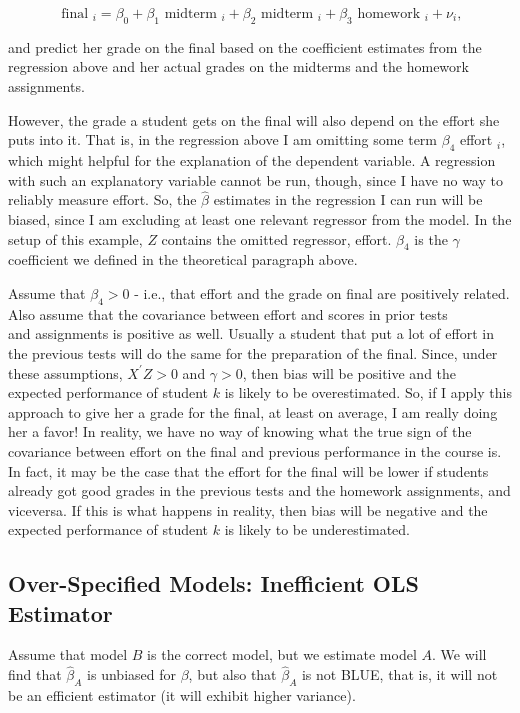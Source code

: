$$
\text { final }_{i}=\beta_{0}+\beta_{1} \text { midterm }_{i}+\beta_{2} \text { midterm }_{i}+\beta_{3} \text { homework }_{i}+\nu_{i},
$$

and predict her grade on the final based on the coefficient estimates from the regression above and her actual grades on the midterms and the homework assignments.

However, the grade a student gets on the final will also depend on the effort she puts into it. That is, in the regression above I am omitting some term $\beta_{4}$ effort $_{i}$, which might helpful for the explanation of the dependent variable. A regression with such an explanatory variable cannot be run, though, since I have no way to reliably measure effort. So, the $\widehat{\beta}$ estimates in the regression I can run will be biased, since I am excluding at least one relevant regressor from the model. In the setup of this example, $Z$ contains the omitted regressor, effort. $\beta_{4}$ is the $\gamma$ coefficient we defined in the theoretical paragraph above.

Assume that $\beta_{4}>0$ - i.e., that effort and the grade on final are positively related. Also assume that the covariance between effort and scores in prior tests\\
and assignments is positive as well. Usually a student that put a lot of effort in the previous tests will do the same for the preparation of the final. Since, under these assumptions, $X^{\prime} Z>0$ and $\gamma>0$, then bias will be positive and the expected performance of student $k$ is likely to be overestimated. So, if I apply this approach to give her a grade for the final, at least on average, I am really doing her a favor! In reality, we have no way of knowing what the true sign of the covariance between effort on the final and previous performance in the course is. In fact, it may be the case that the effort for the final will be lower if students already got good grades in the previous tests and the homework assignments, and viceversa. If this is what happens in reality, then bias will be negative and the expected performance of student $k$ is likely to be underestimated.

\subsection{Over-Specified Models: Inefficient OLS Estimator}
Assume that model $B$ is the correct model, but we estimate model $A$. We will find that $\widehat{\beta}_{A}$ is unbiased for $\beta$, but also that $\widehat{\beta}_{A}$ is not BLUE, that is, it will not be an efficient estimator (it will exhibit higher variance).

